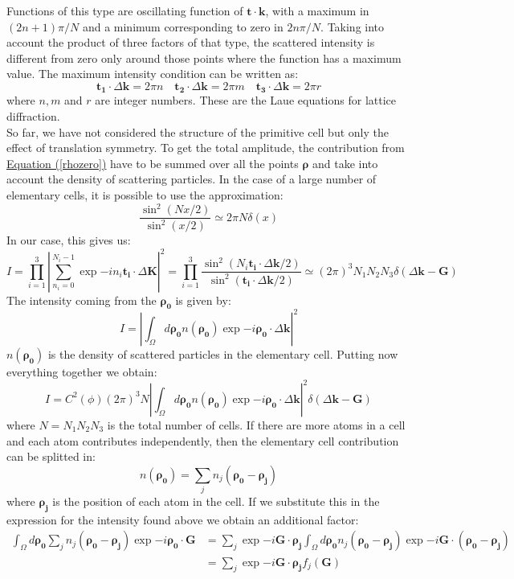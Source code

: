 \documentclass[10.75pt,a4paper,openright,bottom=2cm]{article}
\renewcommand{\Vec}[1]{\boldsymbol{#1}}
\begin{document}
Functions of this type are oscillating function of $\Vec{t}\cdot\Vec{k}$, with a maximum in $(2n+1)\pi/N$ and a minimum corresponding to zero in $2n\pi/N$. Taking into account the product of three factors of that type, the scattered intensity is different from zero only around those points where the function has a maximum value. The maximum intensity condition can be written as:
\[
\Vec{t_1}\cdot\Delta\Vec{k}=2\pi n \quad \Vec{t_2}\cdot\Delta\Vec{k}=2\pi m \quad \Vec{t_3}\cdot\Delta\Vec{k}=2\pi r
\]
where $n,m$ and $r$ are integer numbers. These are the Laue equations for lattice diffraction.\\
So far, we have not considered the structure of the primitive cell but only the effect of translation symmetry. To get the total amplitude, the contribution from \hyperref[rhozero]{Equation (\ref{rhozero})} have to be summed over all the points $\Vec{\rho}$ and take into account the density of scattering particles. In the case of a large number of elementary cells, it is possible to use the approximation:
\[
\frac{\sin^2(Nx/2)}{\sin^2(x/2)}\simeq2\pi N\delta(x)
\]
In our case, this gives us:
\[
I=\prod_{i=1}^3\left|\sum_{n_i=0}^{N_i-1}\exp{-in_i\Vec{t_i}\cdot\Delta\Vec{K}}\right|^2=\prod_{i=1}^3\frac{\sin^2(N_i\Vec{t_i}\cdot\Delta\Vec{k}/2)}{\sin^2(\Vec{t_i}\cdot\Delta\Vec{k}/2)}\simeq(2\pi)^3N_1N_2N_3\delta(\Delta\Vec{k}-\Vec{G})
\]
The intensity coming from the $\Vec{\rho_0}$ is given by:
\[
I=\left|\int_\Omega d\Vec{\rho_0}n(\Vec{\rho_0})\exp{-i\Vec{\rho_0}\cdot\Delta\Vec{k}}\right|^2
\]
$n(\Vec{\rho_0})$ is the density of scattered particles in the elementary cell. Putting now everything together we obtain:
\[
I=C^2(\phi)(2\pi)^3N\left|\int_\Omega d\Vec{\rho_0}n(\Vec{\rho_0})\exp{-i\Vec{\rho_0}\cdot\Delta\Vec{k}}\right|^2\delta(\Delta\Vec{k}-\Vec{G})
\]
where $N=N_1N_2N_3$ is the total number of cells. If there are more atoms in a cell and each atom contributes independently, then the elementary cell contribution can be splitted in:
\[
n(\Vec{\rho_0})=\sum_jn_j(\Vec{\rho_0}-\Vec{\rho_j})
\]
where $\Vec{\rho_j}$ is the position of each atom in the cell. If we substitute this in the expression for the intensity found above we obtain an additional factor:
\begin{align*}
\int_\Omega d\Vec{\rho_0}\sum_jn_j(\Vec{\rho_0}-\Vec{\rho_j})\exp{-i\Vec{\rho_0}\cdot\Vec{G}}&=\sum_j\exp{-i\Vec{G}\cdot\Vec{\rho_j}}\int_\Omega d\Vec{\rho_0}n_j(\Vec{\rho_0}-\Vec{\rho_j})\exp{-i\Vec{G}\cdot(\Vec{\rho_0}-\Vec{\rho_j})}\\
&=\sum_j\exp{-i\Vec{G}\cdot\Vec{\rho_j}}f_j(\Vec{G})
\end{align*}
\end{document}
